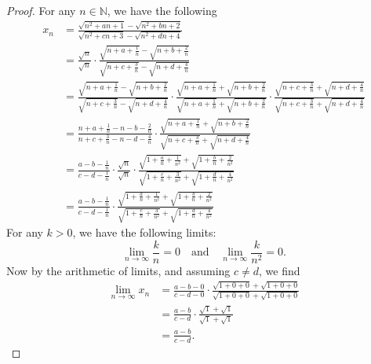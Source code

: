 \documentclass[12pt]{article}
\newcommand{\isp}[1]{\quad\text{#1}\quad}
\newcommand{\N}{\mathbb{N}} %
\newcommand{\<}{\left\langle} %
\renewcommand{\>}{\right\rangle} %
\begin{document}
\begin{proof}
    For any $n\in\N$, we have the following
    \begin{align*}
        x_n
            &= \frac{\sqrt{n^2+an+1}-\sqrt{n^2+bn+2}}{\sqrt{n^2+cn+3}-\sqrt{n^2+dn+4}} \\
            &= \frac{\sqrt{n}}{\sqrt{n}} \cdot \frac{\sqrt{n+a+\frac1n}-\sqrt{n+b+\frac2n}}{\sqrt{n+c+\frac3n}-\sqrt{n+d+\frac4n}} \\
            &= \frac{\sqrt{n+a+\frac1n}-\sqrt{n+b+\frac2n}}{\sqrt{n+c+\frac3n}-\sqrt{n+d+\frac4n}}\cdot\frac{\sqrt{n+a+\frac1n}+\sqrt{n+b+\frac2n}}{\sqrt{n+a+\frac1n}+\sqrt{n+b+\frac2n}}\cdot\frac{\sqrt{n+c+\frac3n}+\sqrt{n+d+\frac4n}}{\sqrt{n+c+\frac3n}+\sqrt{n+d+\frac4n}} \\
            &= \frac{n+a+\frac1n-n-b-\frac2n}{n+c+\frac3n-n-d-\frac4n}\cdot\frac{\sqrt{n+a+\frac1n}+\sqrt{n+b+\frac2n}}{\sqrt{n+c+\frac3n}+\sqrt{n+d+\frac4n}} \\
            &= \frac{a-b -\frac1n}{c- d -\frac1n} \cdot \frac{\sqrt{n}}{\sqrt{n}} \cdot  \frac{\sqrt{1+\frac{a}n+\frac1{n^2}}+\sqrt{1+\frac{b}n+\frac2{n^2}}}{\sqrt{1+\frac{c}n+\frac3{n^2}}+\sqrt{1+\frac{d}n+\frac4{n^2}}} \\
            &= \frac{a-b -\frac1n}{c- d -\frac1n} \cdot  \frac{\sqrt{1+\frac{a}n+\frac1{n^2}}+\sqrt{1+\frac{b}n+\frac2{n^2}}}{\sqrt{1+\frac{c}n+\frac3{n^2}}+\sqrt{1+\frac{d}n+\frac4{n^2}}}
    \end{align*}
    For any $k>0$, we have the following limits:
    \[\lim_{n\to\infty} \frac kn = 0 \isp{and} \lim_{n\to\infty} \frac k{n^2} = 0.\]
    Now by the arithmetic of limits, and assuming $c\ne d$, we find
    \begin{align*}
        \lim_{n\to\infty} x_n
            &=  \frac{a-b -0}{c- d -0} \cdot  \frac{\sqrt{1+0+0}+\sqrt{1+0+0}}{\sqrt{1+0+0}+\sqrt{1+0+0}} \\
            &=  \frac{a-b}{c- d } \cdot  \frac{\sqrt{1}+\sqrt{1}}{\sqrt{1}+\sqrt{1}} \\
            &=  \frac{a-b}{c- d }.
    \end{align*}
    

\end{proof}
\end{document}
